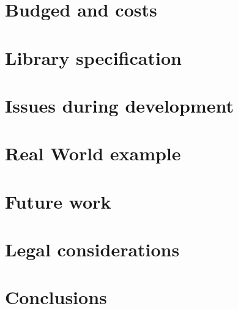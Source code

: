 \documentclass[11pt,a4paper,titlepage]{article}
\begin{document}
    \section{Budged and costs}
    
    \section{Library specification}
    
    \section{Issues during development}
    
    \section{Real World example}
    
    \section{Future work}
    
    \section{Legal considerations}
    
    \section{Conclusions}
    
    
	\newpage
    
	
    
    
\end{document}
